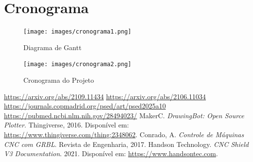 \documentclass[a4paper,12pt]{article}
\begin{document}
\section{Cronograma}  
\begin{figure}[H]  
    \centering  
    \texttt{[image: images/cronograma1.png]}   
    \caption{Diagrama de Gantt}  
    \label{fig:cronograma_gantt}  
\end{figure}  

\vspace{1em}  

\begin{figure}[H]  
    \centering  
    \texttt{[image: images/cronograma2.png]}   
    \caption{Cronograma do Projeto}  
    \label{fig:cronograma_projeto}  
\end{figure}  

\vspace{1em}  

\begin{thebibliography}{9}  
 \href{https://arxiv.org/abs/2109.11434}{https://arxiv.org/abs/2109.11434}  
 \href{https://arxiv.org/abs/2106.11034}{https://arxiv.org/abs/2106.11034}  
 \href{https://journals.copmadrid.org/psed/art/psed2025a10}{https://journals.copmadrid.org/psed/art/psed2025a10}  
 \href{https://pubmed.ncbi.nlm.nih.gov/28494023/}{https://pubmed.ncbi.nlm.nih.gov/28494023/}  
 MakerC. \textit{DrawingBot: Open Source Plotter}. Thingiverse, 2016. Disponível em: \url{https://www.thingiverse.com/thing:2348062}.  
 Conrado, A. \textit{Controle de Máquinas CNC com GRBL}. Revista de Engenharia, 2017.  
 Handson Technology. \textit{CNC Shield V3 Documentation}. 2021. Disponível em: \url{https://www.handsontec.com}.  
\end{thebibliography}  
\end{document}
